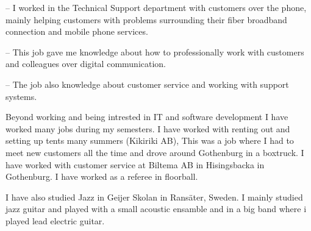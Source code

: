 \documentclass[color=NavyBlue]{devResume}
\begin{document}
{            
                {
                    \item[--] I worked in the Technical Support department with customers over the phone, mainly helping customers with problems surrounding their fiber broadband connection and mobile phone services.
                    \item[--] This job gave me knowledge about how to professionally work with customers and colleagues over digital communication.
                    \item[--] The job also knowledge about customer service and working with support systems.
                }

            Beyond working and being intrested in IT and software development I have worked many jobs during my semesters.
            I have worked with renting out and setting up tents many summers (Kikiriki AB), This was a job where I had to meet new customers all the time and drove around Gothenburg in a boxtruck.
            I have worked with customer service at Biltema AB in Hisingsbacka in Gothenburg.
            I have worked as a referee in floorball.

            \smallskip
            I have also studied Jazz in Geijer Skolan in Ransäter, Sweden. I mainly studied jazz guitar and played with a small acoustic ensamble and in a big band where i played lead electric guitar.

    }
\end{document}
